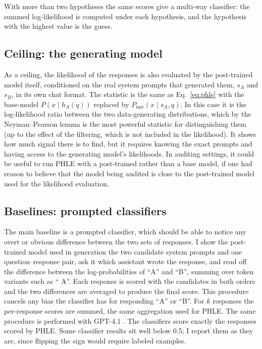 \documentclass{article}
\newcommand{\phle}{PHLE\xspace}
\begin{document}
With more than two hypotheses the same scores give a multi-way classifier: the summed log-likelihood is computed under each hypothesis, and the hypothesis with the highest value is the guess.

\subsection{Ceiling: the generating model}

As a ceiling, the likelihood of the responses is also evaluated by the post-trained model itself, conditioned on the real system prompts that generated them, $s_A$ and $s_B$, in its own chat format.
The statistic is the same as Eq.~\eqref{eq:phle} with the base-model $P(x \mid h_A(q))$ replaced by $P_{\text{inst}}(x \mid s_A, q)$.
In this case it is the log-likelihood ratio between the two data-generating distributions, which by the Neyman--Pearson lemma \citep{neyman1933} is the most powerful statistic for distinguishing them (up to the effect of the filtering, which is not included in the likelihood).
It shows how much signal there is to find, but it requires knowing the exact prompts and having access to the generating model's likelihoods.
In auditing settings, it could be useful to run \phle with a post-trained rather than a base model, if one had reason to believe that the model being audited is close to the post-trained model used for the likelihood evaluation.

\subsection{Baselines: prompted classifiers}

The main baseline is a prompted classifier, which should be able to notice any overt or obvious difference between the two sets of responses.
I show the post-trained model used in generation the two candidate system prompts and one question--response pair, ask it which assistant wrote the response, and read off the difference between the log-probabilities of ``A'' and ``B'', summing over token variants such as `` A''.
Each response is scored with the candidates in both orders and the two differences are averaged to produce the final score. 
This procedure cancels any bias the classifier has for responding ``A'' or ``B''.
For $k$ responses the per-response scores are summed, the same aggregation used for \phle.
The same procedure is performed with GPT-4.1 \citep{openai2025gpt41}.
The classifiers score exactly the responses scored by \phle.
Some classifier results sit well below 0.5; I report them as they are, since flipping the sign would require labeled examples.
\end{document}
